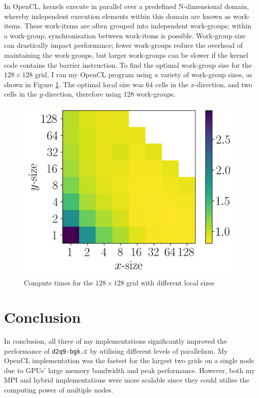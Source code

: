 \documentclass[twocolumn, a4paper]{article}
\begin{document}
In OpenCL, kernels execute in parallel over a predefined N-dimensional domain, whereby independent execution elements within this domain are known as work-items.
These work-items are often grouped into independent work-groups; within a work-group, synchronisation between work-items is possible.
Work-group size can drastically impact performance; fewer work-groups reduce the overhead of maintaining the work-groups, but larger work-groups can be slower if the kernel code contains the barrier instruction.
To find the optimal work-group size for the $128\times128$ grid, I ran my OpenCL program using a variety of work-group sizes, as shown in Figure \ref{fig:wg_size}.
The optimal local size was $64$ cells in the $x$-direction, and two cells in the $y$-direction, therefore using 128 work-groups.

\begin{figure}[htbp]
  \centering
  \includegraphics[width=0.75\linewidth]{wg_size.png}
  \caption{Compute times for the $128\times128$ grid with different local sizes}\label{fig:wg_size}
\end{figure}

\section{Conclusion}

In conclusion, all three of my implementations significantly improved the performance of \texttt{d2q9-bgk.c} by utilising different levels of parallelism.
My OpenCL implementation was the fastest for the largest two grids on a single node due to GPUs' large memory bandwidth and peak performance.
However, both my MPI and hybrid implementations were more scalable since they could utilise the computing power of multiple nodes.

\printbibliography
\end{document}
